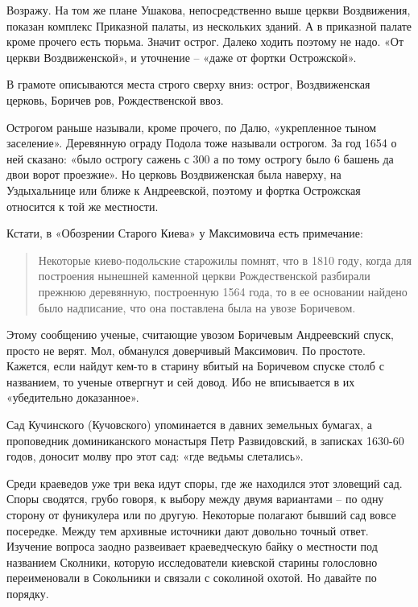 Возражу. На том же плане Ушакова, непосредственно выше церкви Воздвижения, показан комплекс Приказной палаты, из нескольких зданий. А в приказной палате кроме прочего есть тюрьма. Значит острог. Далеко ходить поэтому не надо. «От церкви Воздвиженской», и уточнение – «даже от фортки Острожской».

В грамоте описываются места строго сверху вниз: острог, Воздвиженская церковь, Боричев ров, Рождественской ввоз.

Острогом раньше называли, кроме прочего, по Далю, «укрепленное тыном  заселение». Деревянную ограду Подола тоже называли острогом. За год 1654 о ней сказано: «было острогу сажень с 300 а по тому острогу было 6 башень да двои ворот проезжие»\cite[том X, стр. 387]{akty}. Но церковь Воздвиженская была наверху, на Уздыхальнице или ближе к Андреевской, поэтому и фортка Острожская относится к той же местности.

Кстати, в «Обозрении Старого Киева» у Максимовича есть примечание: 

\begin{quotation}
Некоторые киево-подольские старожилы помнят, что в 1810 году, когда для построения нынешней каменной церкви Рождественской разбирали прежнюю деревянную, построенную 1564 года, то в ее основании найдено было надписание, что она поставлена была на увозе Боричевом. 
\end{quotation}

Этому сообщению ученые, считающие увозом Боричевым Андреевский спуск, просто не верят. Мол, обманулся доверчивый Максимович. По простоте. Кажется, если найдут кем-то в старину вбитый на Боричевом спуске столб с названием, то ученые отвергнут и сей довод. Ибо не вписывается в их «убедительно доказанное».

Сад Кучинского (Кучовского) упоминается в давних земельных бумагах, а проповедник доминиканского монастыря Петр Развидовский, в записках 1630-60 годов, доносит молву про этот сад: «где ведьмы слетались».

Среди краеведов уже три века идут споры, где же находился этот зловещий сад. Споры сводятся, грубо говоря, к выбору между двумя вариантами – по одну сторону от фуникулера или по другую. Некоторые полагают бывший сад вовсе посередке. Между тем архивные источники дают довольно точный ответ. Изучение вопроса заодно развеивает краеведческую байку о местности под названием Сколники, которую исследователи киевской старины голословно переименовали в Сокольники и связали с соколиной охотой. Но давайте по порядку.

